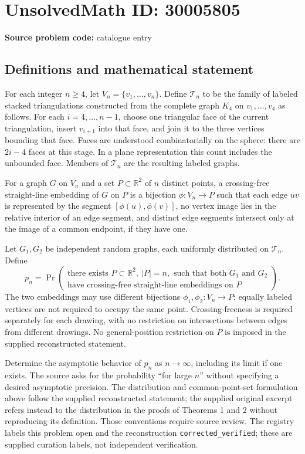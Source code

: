 \documentclass[11pt]{article}
\newcommand{\R}{\mathbb{R}}
\begin{document}
\section*{UnsolvedMath ID: 30005805}
\textbf{Source problem code:} catalogue entry
\subsection{Definitions and mathematical statement}
For each integer \(n\geq 4\), let \(V_n=\{v_1,\ldots,v_n\}\). Define \(\mathcal T_n\) to be the family of labeled stacked triangulations constructed from the complete graph \(K_4\) on \(v_1,\ldots,v_4\) as follows. For each \(i=4,\ldots,n-1\), choose one triangular face of the current triangulation, insert \(v_{i+1}\) into that face, and join it to the three vertices bounding that face. Faces are understood combinatorially on the sphere: there are \(2i-4\) faces at this stage. In a plane representation this count includes the unbounded face. Members of \(\mathcal T_n\) are the resulting labeled graphs.

For a graph \(G\) on \(V_n\) and a set \(P\subset\R^2\) of \(n\) distinct points, a crossing-free straight-line embedding of \(G\) on \(P\) is a bijection \(\phi:V_n\to P\) such that each edge \(uv\) is represented by the segment \([\phi(u),\phi(v)]\), no vertex image lies in the relative interior of an edge segment, and distinct edge segments intersect only at the image of a common endpoint, if they have one.

Let \(G_1,G_2\) be independent random graphs, each uniformly distributed on \(\mathcal T_n\). Define
\[
 p_n=\Pr\!\left(\begin{array}{l}
 \text{there exists }P\subset\R^2,\ |P|=n,\text{ such that both }G_1\text{ and }G_2\\
 \text{have crossing-free straight-line embeddings on }P
 \end{array}\right).
\]
The two embeddings may use different bijections \(\phi_1,\phi_2:V_n\to P\); equally labeled vertices are not required to occupy the same point. Crossing-freeness is required separately for each drawing, with no restriction on intersections between edges from different drawings. No general-position restriction on \(P\) is imposed in the supplied reconstructed statement.

Determine the asymptotic behavior of \(p_n\) as \(n\to\infty\), including its limit if one exists. The source asks for the probability ``for large \(n\)'' without specifying a desired asymptotic precision. The distribution and common-point-set formulation above follow the supplied reconstructed statement; the supplied original excerpt refers instead to the distribution in the proofs of Theorems 1 and 2 without reproducing its definition. Those conventions require source review. The registry labels this problem open and the reconstruction \texttt{corrected\_verified}; these are supplied curation labels, not independent verification.
\end{document}
